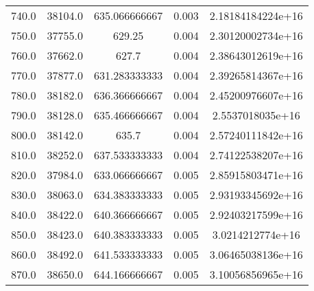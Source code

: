 \begin{table}
\begin{tabular}{ccccc}
740.0 & 38104.0 & 635.066666667 & 0.003 & 2.18184184224e+16 \\
750.0 & 37755.0 & 629.25 & 0.004 & 2.30120002734e+16 \\
760.0 & 37662.0 & 627.7 & 0.004 & 2.38643012619e+16 \\
770.0 & 37877.0 & 631.283333333 & 0.004 & 2.39265814367e+16 \\
780.0 & 38182.0 & 636.366666667 & 0.004 & 2.45200976607e+16 \\
790.0 & 38128.0 & 635.466666667 & 0.004 & 2.5537018035e+16 \\
800.0 & 38142.0 & 635.7 & 0.004 & 2.57240111842e+16 \\
810.0 & 38252.0 & 637.533333333 & 0.004 & 2.74122538207e+16 \\
820.0 & 37984.0 & 633.066666667 & 0.005 & 2.85915803471e+16 \\
830.0 & 38063.0 & 634.383333333 & 0.005 & 2.93193345692e+16 \\
840.0 & 38422.0 & 640.366666667 & 0.005 & 2.92403217599e+16 \\
850.0 & 38423.0 & 640.383333333 & 0.005 & 3.0214212774e+16 \\
860.0 & 38492.0 & 641.533333333 & 0.005 & 3.06465038136e+16 \\
870.0 & 38650.0 & 644.166666667 & 0.005 & 3.10056856965e+16 \\
\end{tabular}
\end{table}
